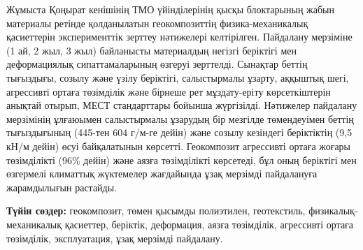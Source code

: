 Жұмыста Қоңырат кенішінің ТМО үйінділерінің қысқы блоктарының жабын
материалы ретінде қолданылатын геокомпозиттің физика-механикалық
қасиеттерін эксперименттік зерттеу нәтижелері келтірілген. Пайдалану
мерзіміне (1 ай, 2 жыл, 3 жыл) байланысты материалдың негізгі беріктігі
мен деформациялық сипаттамаларының өзгеруі зерттелді. Сынақтар беттің
тығыздығы, созылу және үзілу беріктігі, салыстырмалы ұзарту, аққыштық
шегі, агрессивті ортаға төзімділік және бірнеше рет мұздату-еріту
көрсеткіштерін анықтай отырып, МЕСТ стандарттары бойынша жүргізілді.
Нәтижелер пайдалану мерзімінің ұлғаюымен салыстырмалы ұзарудың бір
мезгілде төмендеуімен беттің тығыздығының (445-тен 604
г/м-ге дейін) және созылу кезіндегі беріктіктің (9,5
кН/м дейін) өсуі байқалатынын көрсетті. Геокомпозит агрессивті ортаға
жоғары төзімділікті (96\% дейін) және аязға төзімділікті көрсетеді, бұл
оның беріктігі мен өзгермелі климаттық жүктемелер жағдайында ұзақ
мерзімді пайдалануға жарамдылығын растайды.

{\bfseries Түйін сөздер:} геокомпозит, төмен қысымды полиэтилен,
геотекстиль, физикалық-механикалық қасиеттер, беріктік, деформация,
аязға төзімділік, агрессивті ортаға төзімділік, эксплуатация, ұзақ
мерзімді пайдалану.

